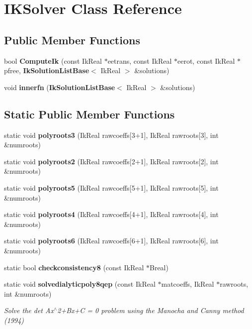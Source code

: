 \section{I\-K\-Solver Class Reference}
\label{class_i_k_solver}
\subsection*{Public Member Functions}
\begin{DoxyCompactItemize}
\item 
bool {\bfseries Compute\-Ik} (const Ik\-Real $\ast$eetrans, const Ik\-Real $\ast$eerot, const Ik\-Real $\ast$pfree, {\bf Ik\-Solution\-List\-Base}$<$ Ik\-Real $>$ \&solutions)\label{class_i_k_solver_ac0195e291bed491b4cb6a68db8199b55}

\item 
void {\bfseries innerfn} ({\bf Ik\-Solution\-List\-Base}$<$ Ik\-Real $>$ \&solutions)\label{class_i_k_solver_a5052994576b6519164e978e851c3237c}

\end{DoxyCompactItemize}
\subsection*{Static Public Member Functions}
\begin{DoxyCompactItemize}
\item 
static void {\bfseries polyroots3} (Ik\-Real rawcoeffs[3+1], Ik\-Real rawroots[3], int \&numroots)\label{class_i_k_solver_a46a898ea503f9399df84df127f7f84eb}

\item 
static void {\bfseries polyroots2} (Ik\-Real rawcoeffs[2+1], Ik\-Real rawroots[2], int \&numroots)\label{class_i_k_solver_a16a33b8d7de25af06070fb7c55e80bb1}

\item 
static void {\bfseries polyroots5} (Ik\-Real rawcoeffs[5+1], Ik\-Real rawroots[5], int \&numroots)\label{class_i_k_solver_af7c3645579c9598e04c140915d85742c}

\item 
static void {\bfseries polyroots4} (Ik\-Real rawcoeffs[4+1], Ik\-Real rawroots[4], int \&numroots)\label{class_i_k_solver_a771ebe9dbd8593520e8aab200e3c141a}

\item 
static void {\bfseries polyroots6} (Ik\-Real rawcoeffs[6+1], Ik\-Real rawroots[6], int \&numroots)\label{class_i_k_solver_a22e3d8d4252075c8b7096f5dacf86119}

\item 
static bool {\bfseries checkconsistency8} (const Ik\-Real $\ast$Breal)\label{class_i_k_solver_abecf6ea0c9933661bd0f3caeb0561881}

\item 
static void {\bf solvedialyticpoly8qep} (const Ik\-Real $\ast$matcoeffs, Ik\-Real $\ast$rawroots, int \&numroots)
\begin{DoxyCompactList}\small\item\em Solve the det Ax$^\wedge$2+\-Bx+\-C = 0 problem using the Manocha and Canny method (1994) \end{DoxyCompactList}\end{DoxyCompactItemize}
